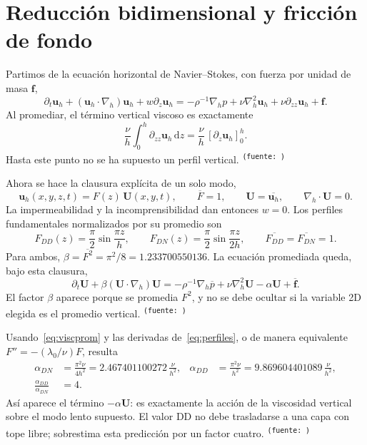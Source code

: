 \documentclass[11pt,a4paper]{article}
\newcommand{\src}[1]{\textsuperscript{\texttt{(fuente: \detokenize{#1})}}}
\newcommand{\dd}{\mathrm{d}}
\newcommand{\avg}[1]{\overline{#1}}
\begin{document}
\section{Reducción bidimensional y fricción de fondo}
\label{sec:reduccion}

Partimos de la ecuación horizontal de Navier--Stokes, con fuerza por unidad de
masa \(\boldsymbol f\),
\begin{equation}
 \partial_t\boldsymbol u_h
 +(\boldsymbol u_h\!\cdot\!\nabla_h)\boldsymbol u_h
 +w\partial_z\boldsymbol u_h
 =-\rho^{-1}\nabla_h p
 +\nu\nabla_h^2\boldsymbol u_h+\nu\partial_{zz}\boldsymbol u_h
 +\boldsymbol f .
 \label{eq:NS3d}
\end{equation}
Al promediar, el término vertical viscoso es exactamente
\begin{equation}
 \frac\nu h\int_0^h\partial_{zz}\boldsymbol u_h\,\dd z
 =\frac\nu h\,[\partial_z\boldsymbol u_h]_{0}^{h}.
 \label{eq:viscprom}
\end{equation}
Hasta este punto no se ha supuesto un perfil vertical.
\src{promedio_ns}

Ahora se hace la clausura explícita de un solo modo,
\begin{equation}
 \boldsymbol u_h(x,y,z,t)=F(z)\,\boldsymbol U(x,y,t),\qquad
 \avg F=1,\qquad \boldsymbol U=\avg{\boldsymbol u_h},\qquad
 \nabla_h\!\cdot\!\boldsymbol U=0.
 \label{eq:ansatz}
\end{equation}
La impermeabilidad y la incomprensibilidad dan entonces \(w=0\). Los perfiles
fundamentales normalizados por su promedio son
\begin{equation}
 F_{DD}(z)=\frac\pi2\sin\!\frac{\pi z}{h},\qquad
 F_{DN}(z)=\frac\pi2\sin\!\frac{\pi z}{2h},\qquad
 \avg{F_{DD}}=\avg{F_{DN}}=1.
 \label{eq:perfiles}
\end{equation}
Para ambos, \(\beta=\avg{F^2}=\pi^2/8=1.233700550136\). La ecuación promediada
queda, bajo esta clausura,
\begin{equation}
 \partial_t\boldsymbol U+\beta(\boldsymbol U\!\cdot\!\nabla_h)\boldsymbol U
 =-\rho^{-1}\nabla_h\avg p+\nu\nabla_h^2\boldsymbol U
 -\alpha\boldsymbol U+\avg{\boldsymbol f}.
 \label{eq:NS2d}
\end{equation}
El factor \(\beta\) aparece porque se promedia \(F^2\), y no se debe ocultar si
la variable 2D elegida es el promedio vertical.
\src{reduccion_modal}

Usando~\eqref{eq:viscprom} y las derivadas de~\eqref{eq:perfiles}, o de manera
equivalente \(F''=-(\lambda_0/\nu)F\), resulta
\begin{align}
 \alpha_{DN}&=\frac{\pi^2\nu}{4h^2}
 =2.467401100272\,\frac\nu{h^2},
 & \alpha_{DD}&=\frac{\pi^2\nu}{h^2}
 =9.869604401089\,\frac\nu{h^2},
 \label{eq:alfas}\\
 \frac{\alpha_{DD}}{\alpha_{DN}}&=4.
 \label{eq:factor4}
\end{align}
Así aparece el término \(-\alpha\boldsymbol U\): es exactamente la acción de la
viscosidad vertical sobre el modo lento supuesto. El valor DD no debe trasladarse
a una capa con tope libre; sobrestima esta predicción por un factor cuatro.
\src{alfas}
\end{document}
